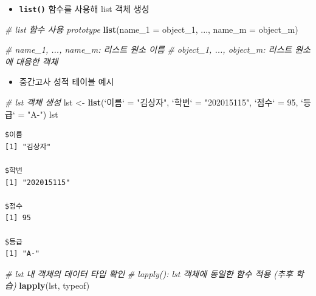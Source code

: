 \documentclass[
  11pt,
]{krantz}
\newenvironment{Shaded}{\begin{snugshade}}{\end{snugshade}}
\newcommand{\CommentTok}[1]{\textcolor[rgb]{0.37,0.37,0.37}{\textit{#1}}}
\newcommand{\DataTypeTok}[1]{\textcolor[rgb]{0.27,0.27,0.27}{#1}}
\newcommand{\DecValTok}[1]{\textcolor[rgb]{0.06,0.06,0.06}{#1}}
\newcommand{\KeywordTok}[1]{\textcolor[rgb]{0.27,0.27,0.27}{\textbf{#1}}}
\newcommand{\NormalTok}[1]{#1}
\newcommand{\StringTok}[1]{\textcolor[rgb]{0.5,0.5,0.5}{#1}}
\providecommand{\tightlist}{%
  \setlength{\itemsep}{0pt}\setlength{\parskip}{0pt}}
\begin{document}
\begin{itemize}
\tightlist
\item
  \textbf{\texttt{list()}} 함수를 사용해 list 객체 생성
\end{itemize}

\footnotesize

\begin{Shaded}
\begin{Highlighting}[]
\CommentTok{# list 함수 사용 prototype}
\KeywordTok{list}\NormalTok{(}\DataTypeTok{name_1 =}\NormalTok{ object_}\DecValTok{1}\NormalTok{, ..., }\DataTypeTok{name_m =}\NormalTok{ object_m)}

\CommentTok{# name_1, ..., name_m: 리스트 원소 이름}
\CommentTok{# object_1, ..., object_m: 리스트 원소에 대응한 객체}
\end{Highlighting}
\end{Shaded}

\normalsize

\begin{itemize}
\tightlist
\item
  중간고사 성적 테이블 예시
\end{itemize}

\footnotesize

\begin{Shaded}
\begin{Highlighting}[]
\CommentTok{# lst 객체 생성}
\NormalTok{lst <-}\StringTok{ }\KeywordTok{list}\NormalTok{(}\StringTok{`}\DataTypeTok{이름}\StringTok{`}\NormalTok{ =}\StringTok{ "김상자"}\NormalTok{, }
            \StringTok{`}\DataTypeTok{학번}\StringTok{`}\NormalTok{ =}\StringTok{ "202015115"}\NormalTok{, }
            \StringTok{`}\DataTypeTok{점수}\StringTok{`}\NormalTok{ =}\StringTok{ }\DecValTok{95}\NormalTok{, }
            \StringTok{`}\DataTypeTok{등급}\StringTok{`}\NormalTok{ =}\StringTok{ "A-"}\NormalTok{)}
\NormalTok{lst}
\end{Highlighting}
\end{Shaded}

\begin{verbatim}
$이름
[1] "김상자"

$학번
[1] "202015115"

$점수
[1] 95

$등급
[1] "A-"
\end{verbatim}

\begin{Shaded}
\begin{Highlighting}[]
\CommentTok{# lst 내 객체의 데이터 타입 확인}
\CommentTok{# lapply(): lst 객체에 동일한 함수 적용 (추후 학습)}
\KeywordTok{lapply}\NormalTok{(lst, typeof)}
\end{Highlighting}
\end{Shaded}
\end{document}
